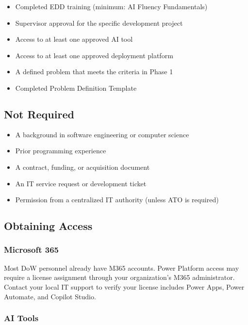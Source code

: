 \documentclass[11pt,letterpaper]{article}
\begin{document}
\begin{itemize}
  \item Completed EDD training (minimum: AI Fluency Fundamentals)
  \item Supervisor approval for the specific development project
  \item Access to at least one approved AI tool
  \item Access to at least one approved deployment platform
  \item A defined problem that meets the criteria in Phase 1
  \item Completed Problem Definition Template
\end{itemize}

\subsection{Not Required}
\label{sec:not-required}

\begin{itemize}
  \item A background in software engineering or computer science
  \item Prior programming experience
  \item A contract, funding, or acquisition document
  \item An IT service request or development ticket
  \item Permission from a centralized IT authority (unless ATO is required)
\end{itemize}

\subsection{Obtaining Access}
\label{sec:obtaining-access}

\subsubsection{Microsoft 365}

Most DoW personnel already have M365 accounts. Power Platform access may require
a license assignment through your organization's M365 administrator. Contact your
local IT support to verify your license includes Power Apps, Power Automate, and
Copilot Studio.

\subsubsection{AI Tools}
\end{document}
